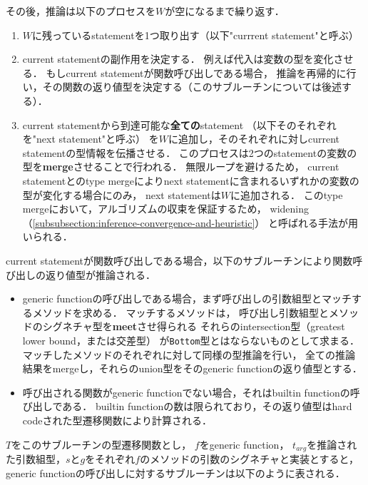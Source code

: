 その後，推論は以下のプロセスを\(W\)が空になるまで繰り返す．

\begin{enumerate}
  \item \(W\)に残っているstatementを1つ取り出す（以下"currrent statement"と呼ぶ）
  \item current statementの副作用を決定する．
        例えば代入は変数の型を変化させる．
        もしcurrent statementが関数呼び出しである場合，
        推論を再帰的に行い，その関数の返り値型を決定する（このサブルーチンについては後述する）．
  \item current statementから到達可能な\textbf{全ての}statement
        （以下そのそれぞれを"next statement"と呼ぶ）
        を\(W\)に追加し，そのそれぞれに対しcurrent statementの型情報を伝播させる．
        このプロセスは2つのstatementの変数の型を\textbf{merge}させることで行われる．
        無限ループを避けるため，
        current statementとのtype mergeによりnext statementに含まれるいずれかの変数の型が変化する場合にのみ，
        next statementは\(W\)に追加される．
        このtype mergeにおいて，アルゴリズムの収束を保証するため，
        widening（\ref{subsubsection:inference-convergence-and-heuristic}）
        と呼ばれる手法が用いられる．
\end{enumerate}

current statementが関数呼び出しである場合，以下のサブルーチンにより関数呼び出しの返り値型が推論される．

\begin{itemize}
  \item generic functionの呼び出しである場合，まず呼び出しの引数組型とマッチするメソッドを求める．
        マッチするメソッドは，
        呼び出し引数組型とメソッドのシグネチャ型を\textbf{meet}させ得られる
        それらのintersection型（greatest lower bound，または交差型）\footnotemark
        が\texttt{Bottom}型とはならないものとして求まる．
        マッチしたメソッドのそれぞれに対して同様の型推論を行い，
        全ての推論結果をmergeし，それらのunion型をそのgeneric functionの返り値型とする．
  \item 呼び出される関数がgeneric functionでない場合，それはbuiltin functionの呼び出しである．
        builtin functionの数は限られており，その返り値型はhard codeされた型遷移関数により計算される．
\end{itemize}

\(T\)をこのサブルーチンの型遷移関数とし，
\(f\)をgeneric function，
\(t_{arg}\)を推論された引数組型，\(s\)と\(g\)をそれぞれ\(f\)のメソッドの引数のシグネチャと実装とすると，
generic functionの呼び出しに対するサブルーチンは以下のように表される．

